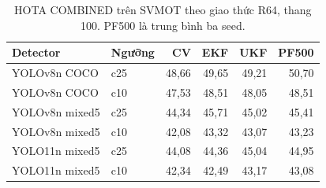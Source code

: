 \begin{table}[htbp]\centering\small
\caption{HOTA COMBINED trên SVMOT theo giao thức R64, thang 100. PF500 là trung bình ba seed.}\label{tab:ngoai-svmot}
\begin{tabular}{llrrrr}\hline
Detector & Ngưỡng & CV & EKF & UKF & PF500\\\hline
YOLOv8n COCO & c25 & 48,66 & 49,65 & 49,21 & 50,70\\
YOLOv8n COCO & c10 & 47,53 & 48,51 & 48,05 & 48,51\\
YOLOv8n mixed5 & c25 & 44,34 & 45,71 & 45,02 & 45,41\\
YOLOv8n mixed5 & c10 & 42,08 & 43,32 & 43,07 & 43,23\\
YOLO11n mixed5 & c25 & 44,08 & 44,36 & 45,04 & 44,95\\
YOLO11n mixed5 & c10 & 42,34 & 42,49 & 43,17 & 43,08\\
\hline\end{tabular}\end{table}
